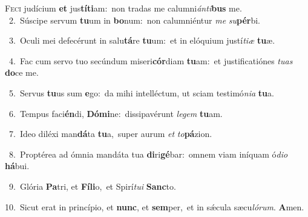 \lettrine{\initial\textcolor{\initialcolor}{F}}{eci} judícium \textbf{et} jus\-\textbf{tí}\-\textbf{ti}am:~\star non tradas me calumni\-\textit{án}\-\textit{ti}\textbf{bus} me.\\
{\numbfont\textcolor{\numbcolor}{~2.}}~Súscipe servum \textbf{tu}\-um in \textbf{bo}\-num:~\star non calumniéntur \textit{me} \textit{su}\-\textbf{pér}bi.\par
{\numbfont\textcolor{\numbcolor}{~3.}}~Oculi mei defecérunt in salu\-\textbf{tá}\-re \textbf{tu}\-um:~\star et in elóquium justí\-\textit{ti}\-\textit{æ} \textbf{tu}\-æ.\par
{\numbfont\textcolor{\numbcolor}{~4.}}~Fac cum servo tuo secúndum miseri\-\textbf{cór}\-diam \textbf{tu}\-am:~\star et justificatiónes \textit{tu}\-\textit{as} \textbf{do}\-ce me.\par
{\numbfont\textcolor{\numbcolor}{~5.}}~Servus \textbf{tu}\-us sum \textbf{e}\-go:~\star da mihi intelléctum, ut sciam testimó\-\textit{ni}\-\textit{a} \textbf{tu}\-a.\par
{\numbfont\textcolor{\numbcolor}{~6.}}~Tempus faci\-\textbf{én}\-di, \textbf{Dó}\-\textbf{mi}ne:~\star dissipavérunt \textit{le}\-\textit{gem} \textbf{tu}\-am.\par
{\numbfont\textcolor{\numbcolor}{~7.}}~Ideo diléxi man\-\textbf{dá}\-ta \textbf{tu}\-a,~\star super aurum \textit{et} \textit{to}\-\textbf{pá}zion.\par
{\numbfont\textcolor{\numbcolor}{~8.}}~Proptérea ad ómnia mandáta tua \textbf{di}\-ri\-\textbf{gé}\-bar:~\star omnem viam iníquam ó\-\textit{di}\-\textit{o} \textbf{há}\-bui.\par
{\numbfont\textcolor{\numbcolor}{~9.}}~Glória \textbf{Pa}\-tri, et \textbf{Fí}\-\textbf{li}o,~\star et Spirí\-\textit{tu}\-\textit{i} \textbf{Sanc}\-to.\par
{\numbfont\textcolor{\numbcolor}{10.}}~Sicut erat in princípio, et \textbf{nunc}\-, et \textbf{sem}\-per,~\star et in sǽcula sæcu\-\textit{ló}\-\textit{rum}. \textbf{A}\-men.\par
